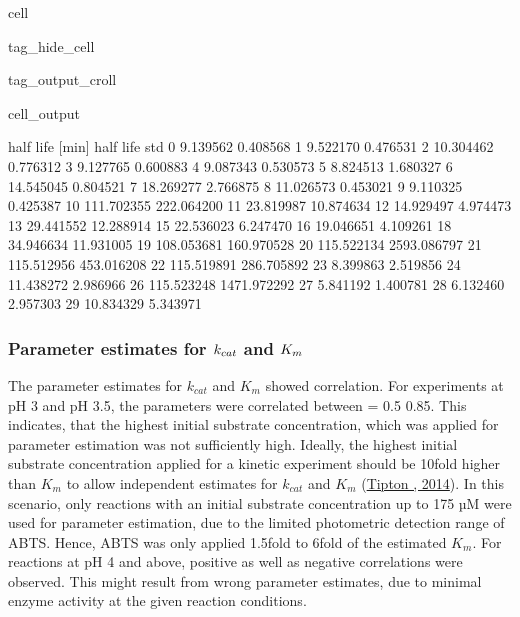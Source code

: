 \documentclass[letterpaper,12pt,english]{jupyterBook}
\begin{document}
\begin{sphinxuseclass}{cell}
\begin{sphinxuseclass}{tag_hide_cell}
\begin{sphinxuseclass}{tag_output_croll}
\begin{sphinxVerbatimOutput}
\begin{sphinxuseclass}{cell_output}
\begin{sphinxVerbatim}[commandchars=\\\{\}]
    half life [min]  half life std  
0          9.139562       0.408568  
1          9.522170       0.476531  
2         10.304462       0.776312  
3          9.127765       0.600883  
4          9.087343       0.530573  
5          8.824513       1.680327  
6         14.545045       0.804521  
7         18.269277       2.766875  
8         11.026573       0.453021  
9          9.110325       0.425387  
10       111.702355     222.064200  
11        23.819987      10.874634  
12        14.929497       4.974473  
13        29.441552      12.288914  
15        22.536023       6.247470  
16        19.046651       4.109261  
18        34.946634      11.931005  
19       108.053681     160.970528  
20       115.522134    2593.086797  
21       115.512956     453.016208  
22       115.519891     286.705892  
23         8.399863       2.519856  
24        11.438272       2.986966  
26       115.523248    1471.972292  
27         5.841192       1.400781  
28         6.132460       2.957303  
29        10.834329       5.343971  
\end{sphinxVerbatim}

\end{sphinxuseclass}\end{sphinxVerbatimOutput}

\end{sphinxuseclass}
\end{sphinxuseclass}
\end{sphinxuseclass}

\subsubsection{Parameter estimates for \protect\(k_{cat}\protect\) and \protect\(K_{m}\protect\)}
\label{\detokenize{scenarios/SLAC_kinetic_characterization:parameter-estimates-for-k-cat-and-k-m}}
\sphinxAtStartPar
The parameter estimates for \(k_{cat}\) and \(K_{m}\) showed correlation. For experiments at pH 3 and pH 3.5, the parameters were correlated between  = 0.5 \sphinxhyphen{} 0.85. This indicates, that the highest initial substrate concentration, which was applied for parameter estimation was not sufficiently high. Ideally, the highest initial substrate concentration applied for a kinetic experiment should be 10\sphinxhyphen{}fold higher than \(K_{m}\) to allow independent estimates for \(k_{cat}\) and \(K_{m}\) (\hyperlink{cite.references:id11}{Tipton , 2014}). In this scenario, only reactions with an initial substrate concentration up to 175 µM were used for parameter estimation, due to the limited photometric detection range of ABTS. Hence, ABTS was only applied 1.5\sphinxhyphen{}fold to 6\sphinxhyphen{}fold of the estimated \(K_{m}\). For reactions at pH 4 and above, positive as well as negative correlations were observed. This might result from wrong parameter estimates, due to minimal enzyme activity at the given reaction conditions.
\end{document}
